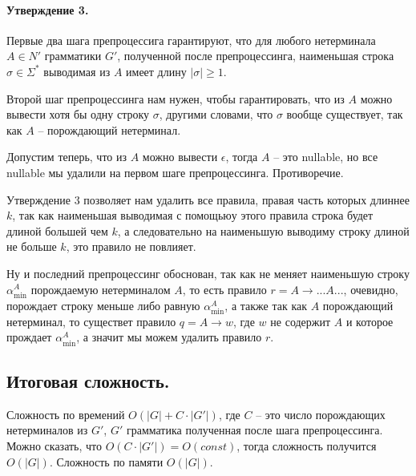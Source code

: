 \documentclass[12pt]{article}
\begin{document}
\paragraph{Утверждение 3.} Первые два шага препроцессига гарантируют, что для
любого нетерминала $ A \in N' $ грамматики $ G' $, полученной после
препроцессинга, наименьшая строка $ \sigma \in \Sigma^* $ выводимая из $ A $
имеет длину $ |\sigma| \ge 1 $.

Второй шаг препроцессинга нам нужен, чтобы гарантировать, что из $ A $ можно
вывести хотя бы одну строку $ \sigma $, другими словами, что $ \sigma $ вообще
существует, так как $ A $ -- порождающий нетерминал.

Допустим теперь, что из $ A $ можно вывести $ \epsilon $, тогда $ A $ -- это
nullable, но все nullable мы удалили на первом шаге препроцессинга.
Противоречие.

Утверждение 3 позволяет нам удалить все правила, правая часть которых длиннее
$ k $, так как наименьшая выводимая с помощьюу этого правила строка будет
длиной большей чем $ k $, а следовательно на наименьшую выводиму строку
длиной не больше $ k $, это правило не повлияет.

Ну и последний препроцессинг обоснован, так как не меняет наименьшую строку
$ \alpha^A_{\min} $ порождаемую нетерминалом $ A $, то есть правило
$ r = A \rightarrow ... A ... $, очевидно, порождает строку меньше либо
равную $ \alpha^A_{\min} $, а также так как $ A $ порождающий нетерминал,
то существет правило $ q = A \rightarrow w $, где $ w $ не содержит $ A $ и
которое прождает $ \alpha^A_{\min} $, а значит мы можем удалить правило
$ r $.

\subsection{Итоговая сложность.}
Сложность по времений $ O(|G| + C \cdot |G'|) $,
где $ C $ -- это число порождающих нетерминалов из $ G' $, $ G' $ грамматика
полученная после шага препроцессинга. Можно сказать, что
$ O(C \cdot |G'|) = O(const) $, тогда сложность получится $ O(|G|)$.
Сложность по памяти $ O(|G|) $.
\end{document}
